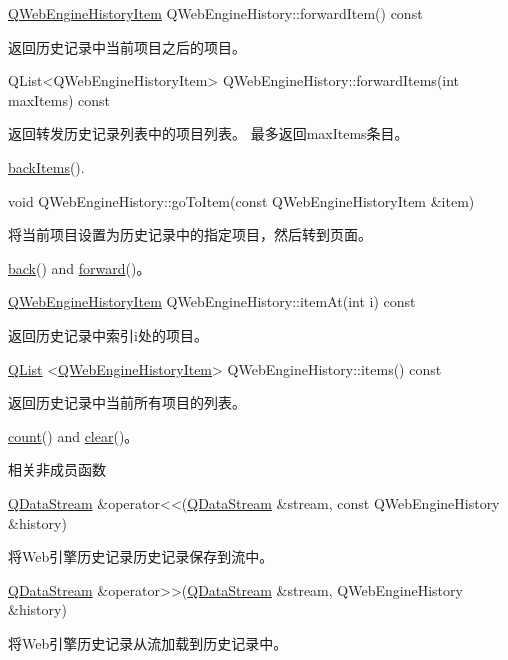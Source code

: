 \href{https://github.com/QtDocumentCN/QtDocumentCN/blob/master/Src/W/QWebEngineHistoryItem/QWebEngineHistoryItem.md}{QWebEngineHistoryItem} QWebEngineHistory::forwardItem() const

返回历史记录中当前项目之后的项目。

QList<QWebEngineHistoryItem> QWebEngineHistory::forwardItems(int maxItems) const

返回转发历史记录列表中的项目列表。 最多返回maxItems条目。

\begin{seeAlso}
	 \href{https://doc.qt.io/qt-5/qwebenginehistory.html#backItems}{backItems}().
\end{seeAlso}

void QWebEngineHistory::goToItem(const QWebEngineHistoryItem \&item)

将当前项目设置为历史记录中的指定项目，然后转到页面。

\begin{seeAlso}
\href{https://doc.qt.io/qt-5/qwebenginehistory.html#back}{back}() and \href{https://doc.qt.io/qt-5/qwebenginehistory.html#forward}{forward}()。
\end{seeAlso}

\href{https://github.com/QtDocumentCN/QtDocumentCN/blob/master/Src/W/QWebEngineHistoryItem/QWebEngineHistoryItem.md}{QWebEngineHistoryItem} QWebEngineHistory::itemAt(int i) const

返回历史记录中索引i处的项目。

\href{https://github.com/QtDocumentCN/QtDocumentCN/blob/master/Src/L/QList/QList.md}{QList} <\href{https://github.com/QtDocumentCN/QtDocumentCN/blob/master/Src/W/QWebEngineHistoryItem/QWebEngineHistoryItem.md}{QWebEngineHistoryItem}> QWebEngineHistory::items() const

返回历史记录中当前所有项目的列表。

\begin{seeAlso}
\href{https://doc.qt.io/qt-5/qwebenginehistory.html#count}{count}() and \href{https://doc.qt.io/qt-5/qwebenginehistory.html#clear}{clear}()。
\end{seeAlso}

相关非成员函数

\href{https://github.com/QtDocumentCN/QtDocumentCN/blob/master/Src/D/QDataStream/QDataStream.md}{QDataStream}  \&operator<<(\href{https://github.com/QtDocumentCN/QtDocumentCN/blob/master/Src/D/QDataStream/QDataStream.md}{QDataStream} \&stream, const QWebEngineHistory \&history)


将Web引擎历史记录历史记录保存到流中。

\href{https://github.com/QtDocumentCN/QtDocumentCN/blob/master/Src/D/QDataStream/QDataStream.md}{QDataStream} \&operator>>(\href{https://github.com/QtDocumentCN/QtDocumentCN/blob/master/Src/D/QDataStream/QDataStream.md}{QDataStream} \&stream, QWebEngineHistory \&history)


将Web引擎历史记录从流加载到历史记录中。

